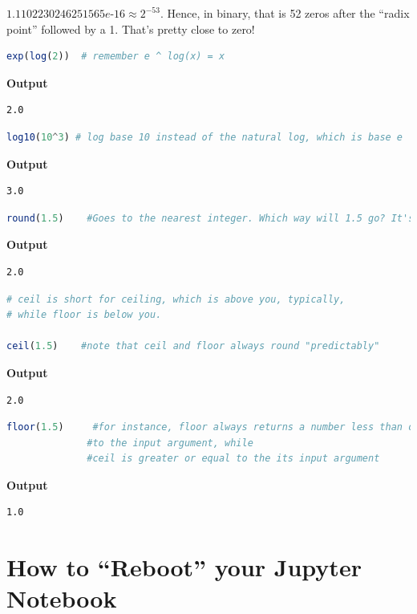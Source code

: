 \begin{rem}
$1.1102230246251565e$-$16 \approx 2 ^{-53}$. Hence, in binary, that is 52 zeros after the ``radix point'' followed by a 1. That's pretty close to zero!
\end{rem}

\begin{lstlisting}[language=Julia,style=mystyle]
exp(log(2))  # remember e ^ log(x) = x
\end{lstlisting}
\textbf{Output} 
\begin{verbatim}
2.0
\end{verbatim}

\begin{lstlisting}[language=Julia,style=mystyle]
log10(10^3) # log base 10 instead of the natural log, which is base e
\end{lstlisting}
\textbf{Output} 
\begin{verbatim}
3.0
\end{verbatim}
\begin{lstlisting}[language=Julia,style=mystyle]
round(1.5)    #Goes to the nearest integer. Which way will 1.5 go? It's quite arbitrary.
\end{lstlisting}
\textbf{Output} 
\begin{verbatim}
2.0
\end{verbatim}

\begin{lstlisting}[language=Julia,style=mystyle]
# ceil is short for ceiling, which is above you, typically,
# while floor is below you.

ceil(1.5)    #note that ceil and floor always round "predictably"
\end{lstlisting}
\textbf{Output} 
\begin{verbatim}
2.0
\end{verbatim}

\begin{lstlisting}[language=Julia,style=mystyle]
floor(1.5)     #for instance, floor always returns a number less than or equal 
              #to the input argument, while
              #ceil is greater or equal to the its input argument
\end{lstlisting}
\textbf{Output} 
\begin{verbatim}
1.0
\end{verbatim}


\section{How to ``Reboot'' your Jupyter Notebook}
\label{sec:Reboot}

